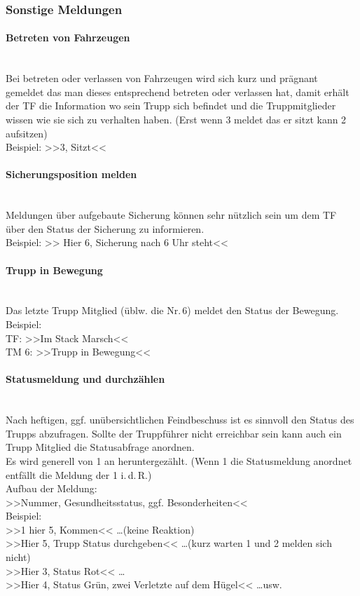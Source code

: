 \subsubsection{Sonstige Meldungen}
	\paragraph*{Betreten von Fahrzeugen}\hfil\\
	Bei betreten oder verlassen von Fahrzeugen wird sich kurz und prägnant gemeldet das man dieses entsprechend betreten oder verlassen hat, damit erhält der TF die Information wo sein Trupp sich befindet und die Truppmitglieder wissen wie sie sich zu verhalten haben. (Erst wenn 3 meldet das er sitzt kann 2 aufsitzen)\\
	Beispiel:  >>3, Sitzt<<

	\paragraph*{Sicherungsposition melden}\hfil\\
	Meldungen über aufgebaute Sicherung können sehr nützlich sein um dem TF über den Status der Sicherung zu informieren. \\
	Beispiel: >> Hier 6, Sicherung nach 6 Uhr steht<<

	\paragraph*{Trupp in Bewegung}\hfil\\
	Das letzte Trupp Mitglied (üblw. die Nr.\,6) meldet den Status der Bewegung. \\
	Beispiel: \\
	TF: >>Im Stack Marsch<< \\
	TM 6: >>Trupp in Bewegung<<
	
	\paragraph*{Statusmeldung und durchzählen}\hfil\\
	Nach heftigen, ggf. unübersichtlichen Feindbeschuss ist es sinnvoll den Status des Trupps abzufragen. Sollte der Truppführer nicht erreichbar sein kann auch ein Trupp Mitglied die Statusabfrage anordnen. \\
	Es wird generell von 1 an heruntergezählt. (Wenn 1 die Statusmeldung anordnet entfällt die Meldung der 1 i.\,d.\,R.)  \\
	Aufbau der Meldung: \\
	>>Nummer, Gesundheitsstatus, ggf. Besonderheiten<<  \\
	Beispiel:\\
	>>1 hier 5, Kommen<< \dots (keine Reaktion)\\  
	>>Hier 5, Trupp Status durchgeben<< \dots (kurz warten 1 und 2 melden sich nicht)\\ >>Hier 3, Status Rot<< \dots\\ 
	>>Hier 4, Status Grün, zwei Verletzte auf dem Hügel<< \dots usw.

